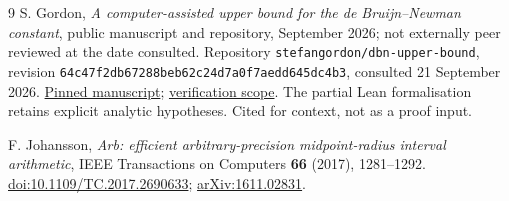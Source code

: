 \documentclass[11pt,a4paper]{article}
\begin{document}
\begin{thebibliography}{9}
S. Gordon,
\emph{A computer-assisted upper bound for the de Bruijn--Newman constant},
public manuscript and repository, September 2026; not externally peer
reviewed at the date consulted. Repository
\texttt{stefangordon/dbn-upper-bound}, revision
\nolinkurl{64c47f2db67288beb62c24d7a0f7aedd645dc4b3},
consulted 21 September 2026.
\href{https://github.com/stefangordon/dbn-upper-bound/blob/64c47f2db67288beb62c24d7a0f7aedd645dc4b3/manuscript/main.md}{Pinned manuscript};
\href{https://github.com/stefangordon/dbn-upper-bound/blob/64c47f2db67288beb62c24d7a0f7aedd645dc4b3/VERIFICATION.md}{verification scope}.
The partial Lean formalisation retains explicit analytic hypotheses.
Cited for context, not as a proof input.

F. Johansson,
\emph{Arb: efficient arbitrary-precision midpoint-radius interval arithmetic},
IEEE Transactions on Computers \textbf{66} (2017), 1281--1292.
\href{https://doi.org/10.1109/TC.2017.2690633}{doi:10.1109/TC.2017.2690633};
\href{https://arxiv.org/abs/1611.02831}{arXiv:1611.02831}.

\end{thebibliography}
\end{document}
